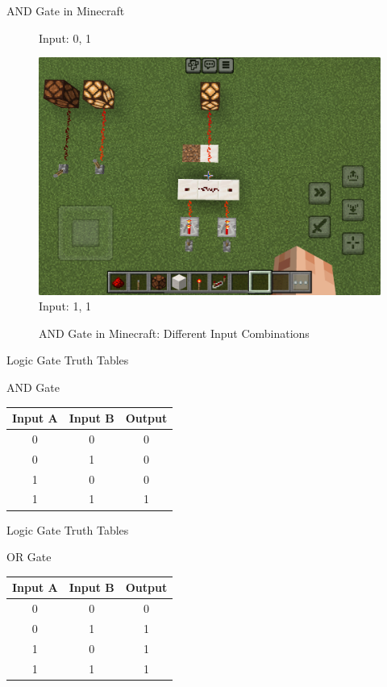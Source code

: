 \documentclass{beamer}
\begin{document}
\begin{frame}{AND Gate in Minecraft}
\begin{figure}[ht]
\begin{minipage}{0.32\textwidth}
            \small Input: 0, 1
        \end{minipage}
        \begin{minipage}{0.32\textwidth}
            \centering
            \includegraphics[width=\textwidth]{images/andgate_11.png}\\
            \small Input: 1, 1
        \end{minipage}
        \caption{AND Gate in Minecraft: Different Input Combinations}
    \end{figure}
\end{frame}

\begin{frame}{Logic Gate Truth Tables}
    \begin{block}{AND Gate}
        \begin{tabular}{|c|c|c|}
            \hline
            Input A & Input B & Output \\
            \hline
            0 & 0 & 0 \\
            0 & 1 & 0 \\
            1 & 0 & 0 \\
            1 & 1 & 1 \\
            \hline
        \end{tabular}
    \end{block}
\end{frame}

\begin{frame}{Logic Gate Truth Tables}
    \begin{block}{OR Gate}
        \begin{tabular}{|c|c|c|}
            \hline
            Input A & Input B & Output \\
            \hline
            0 & 0 & 0 \\
            0 & 1 & 1 \\
            1 & 0 & 1 \\
            1 & 1 & 1 \\
            \hline
        \end{tabular}
    \end{block}
\end{frame}
\end{document}
